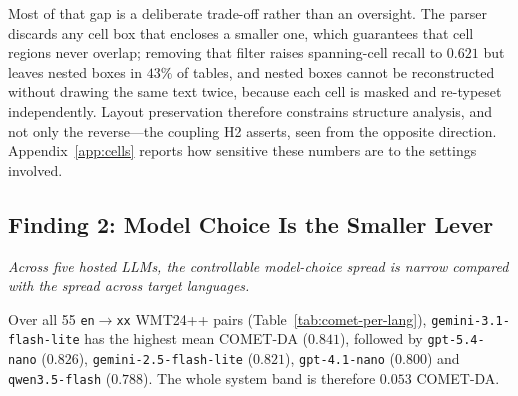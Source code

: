 Most of that gap is a deliberate trade-off rather than an oversight. The parser discards
any cell box that encloses a smaller one, which guarantees that cell regions never
overlap; removing that filter raises spanning-cell recall to $0.621$ but leaves nested
boxes in $43\%$ of tables, and nested boxes cannot be reconstructed without drawing the
same text twice, because each cell is masked and re-typeset independently. Layout
preservation therefore constrains structure analysis, and not only the reverse---the
coupling H2 asserts, seen from the opposite direction. Appendix~\ref{app:cells} reports
how sensitive these numbers are to the settings involved.

\subsection{Finding 2: Model Choice Is the Smaller Lever}
\label{subsec:res-mt}

\emph{Across five hosted LLMs, the controllable model-choice spread is narrow
compared with the spread across target languages.}

Over all 55 \texttt{en}$\rightarrow$\texttt{xx} WMT24++ pairs
(Table~\ref{tab:comet-per-lang}),
\texttt{gemini-3.1-flash-lite} has the highest mean COMET-DA ($0.841$),
followed by \texttt{gpt-5.4-nano} ($0.826$),
\texttt{gemini-2.5-flash-lite} ($0.821$), \texttt{gpt-4.1-nano} ($0.800$) and
\texttt{qwen3.5-flash} ($0.788$). The whole system band is therefore $0.053$
COMET-DA.


